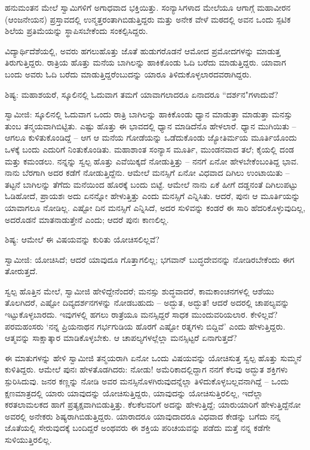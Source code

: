 ಹನುಮಂತನ ಮೇಲೆ ಸ್ವಾಮಿಗಳಿಗೆ ಅಗಾಧವಾದ ಭಕ್ತಿಯಿತ್ತು. ಸಂನ್ಯಾಸಿಗಳಾದ ಮೇಲೆಯೂ ಆಗಾಗ್ಗೆ ಮಹಾವೀರನ (ಆಂಜನೇಯನ) ಪ್ರಸ್ತಾವದಲ್ಲಿ ಉನ್ಮತ್ತರಂತಾಗಿಬಿಡುತ್ತಿದ್ದರು ಮತ್ತು ಅನೇಕ ವೇಳೆ ಮಠದಲ್ಲಿ ಅವನ ಒಂದು ಸ್ಪಟಿಕ ಶಿಲೆಯ ಪ್ರತಿಮೆಯನ್ನು ಸ್ಥಾಪಿಸಬೇಕೆಂದು ಸಂಕಲ್ಪಿಸಿದ್ದರು.

ವಿದ್ಯಾರ್ಥಿದೆಶೆಯಲ್ಲಿ, ಅವರು ಹಗಲುಹೊತ್ತು ಜೊತೆ ಹುಡುಗರೊಡನೆ ಆಮೋದ ಪ್ರಮೋದಗಳನ್ನು ಮಾಡುತ್ತ ತಿರುಗುತ್ತಿದ್ದರು. ರಾತ್ರಿಯ ಹೊತ್ತು ಮನೆಯ ಬಾಗಿಲನ್ನು ಹಾಕಿಕೊಂಡು ಓದಿ ಬರೆದು ಮಾಡುತ್ತಿದ್ದರು. ಯಾವಾಗ ಬಂದು ಅವರು ಓದಿ ಬರೆದು ಮಾಡುತ್ತಿದ್ದರೆಂಬುದನ್ನು ಯಾರೂ ತಿಳಿದುಕೊಳ್ಳಲಾರದವರಾಗಿದ್ದರು.

\delimiter

ಶಿಷ್ಯ: ಮಹಾಶಯರೆ, ಸ್ಕೂಲಿನಲ್ಲಿ ಓದುವಾಗ ತಮಗೆ ಯಾವಾಗಲಾದರೂ ಏನಾದರೂ “ದರ್ಶನ"ಗಳಾದುವೆ?

ಸ್ವಾಮೀಜಿ: ಸ್ಕೂಲಿನಲ್ಲಿ ಓದುವಾಗ ಒಂದು ರಾತ್ರಿ ಬಾಗಿಲನ್ನು ಹಾಕಿಕೊಂಡು ಧ್ಯಾನ ಮಾಡುತ್ತಾ ಮಾಡುತ್ತಾ ಮನಸ್ಸು ತುಂಬ ತನ್ಮಯವಾಗಿಬಿಟ್ಟಿತು. ಎಷ್ಟು ಹೊತ್ತು ಈ ಭಾವದಲ್ಲಿ ಧ್ಯಾನ ಮಾಡಿದೆನೊ ಹೇಳಲಾರೆ. ಧ್ಯಾನ ಮುಗಿಯಿತು – ಆಗಲೂ ಕುಳಿತುಕೊಂಡಿದ್ದೆ – ಆಗ ಆ ಮನೆಯ ಗೋಡೆಯನ್ನು ಒಡೆದುಕೊಂಡು ಜ್ಯೋತಿರ್ಮಯ ಮೂರ್ತಿಯೊಂದು ಒಳಕ್ಕೆ ಬಂದು ಎದುರಿಗೆ ನಿಂತುಕೊಂಡಿತು. ಮಹಾಶಾಂತ ಸಂನ್ಯಾಸ ಮೂರ್ತಿ, ಮುಂಡನವಾದ ತಲೆ; ಕೈಯಲ್ಲಿ ದಂಡ ಮತ್ತು ಕಮಂಡಲು. ನನ್ನನ್ನು ಸ್ವಲ್ಪ ಹೊತ್ತು ಎವೆಯಿಕ್ಕದೆ ನೋಡುತ್ತಿತ್ತು – ನನಗೆ ಏನೋ ಹೇಳಬೇಕೆಂಬಂತಿದ್ದ ಭಾವ. ನಾನು ಬೆರಗಾಗಿ ಅದರ ಕಡೆಗೆ ನೋಡುತ್ತಿದ್ದೆನು. ಆಮೇಲೆ ಮನಸ್ಸಿಗೆ ಏನೋ ವಿಧವಾದ ದಿಗಿಲು ಉಂಟಾಯಿತು – ತಟ್ಟನೆ ಬಾಗಿಲನ್ನು ತೆಗೆದು ಮನೆಯಿಂದ ಹೊರಕ್ಕೆ ಬಂದು ಬಿಟ್ಟೆ. ಆಮೇಲೆ ನಾನು ಏಕೆ ಹೀಗೆ ದಡ್ಡನಂತೆ ದಿಗಿಲುಪಟ್ಟು ಓಡಿಹೋದೆ, ಪ್ರಾಯಶಃ ಅದು ಏನನ್ನೋ ಹೇಳುತ್ತಿತ್ತು ಎಂದು ಮನಸ್ಸಿಗೆ ಎನ್ನಿಸಿತು. ಆದರೆ, ಪುನಃ ಆ ಮೂರ್ತಿಯನ್ನು ಯಾವಾಗಲೂ ನೋಡಿಲ್ಲ. ಎಷ್ಟೋ ದಿನ ಮನಸ್ಸಿಗೆ ಎನ್ನಿಸಿದೆ, ಅದರ ಸುಳಿವನ್ನು ಕಂಡರೆ ಈ ಸಾರಿ ಹೆದರಿಕೊಳ್ಳುವುದಿಲ್ಲ, ಅದರೊಡನೆ ಮಾತನಾಡುತ್ತೇನೆ ಎಂದು; ಆದರೆ ಪುನಃ ಕಾಣಲಿಲ್ಲ.

ಶಿಷ್ಯ: ಆಮೇಲೆ ಈ ವಿಷಯವನ್ನು ಕುರಿತು ಯೋಚಿಸಲಿಲ್ಲವೆ?

ಸ್ವಾಮೀಜಿ: ಯೋಚಿಸಿದೆ; ಆದರೆ ಯಾವುದೂ ಗೊತ್ತಾಗಲಿಲ್ಲ; ಭಗವಾನ್ ಬುದ್ಧದೇವನನ್ನು ನೋಡಿರಬೇಕೆಂದು ಈಗ ತೋರುತ್ತದೆ.

ಸ್ವಲ್ಪ ಹೊತ್ತಿನ ಮೇಲೆ, ಸ್ವಾಮೀಜಿ ಹೇಳಿದ್ದೇನೆಂದರೆ; ಮನಸ್ಸು ಶುದ್ಧವಾದರೆ, ಕಾಮಕಾಂಚನಗಳಲ್ಲಿ ಆಶೆಯು ತೊಲಗಿದರೆ, ಎಷ್ಟೋ ದಿವ್ಯದರ್ಶನಗಳನ್ನು ನೋಡಬಹುದು – ಅದ್ಭುತ, ಅದ್ಭುತ! ಆದರೆ ಅದರಲ್ಲಿ ಚಾಪಲ್ಯವನ್ನು ಇಟ್ಟುಕೊಳ್ಳಬಾರದು. ಇವುಗಳಲ್ಲಿ ಹಗಲು ರಾತ್ರೆಯೂ ಮನಸ್ಸಿದ್ದರೆ ಸಾಧಕ ಮುಂದುವರಿಯಲಾರ. ಕೇಳಿಲ್ಲವೆ? ಪರಮಹಂಸರು ‘ನನ್ನ ಪ್ರಿಯನಾಥನ ಗರ್ಭಗುಡಿಯ ಹೊರಗೆ ಎಷ್ಟೋ ರತ್ನಗಳು ಬಿದ್ದಿವೆ’ ಎಂದು ಹೇಳುತ್ತಿದ್ದರು. ಆತ್ಮವನ್ನು ಸಾಕ್ಷಾತ್ಕಾರ ಮಾಡಿಕೊಳ್ಳಬೇಕು. ಆ ಚಾಪಲ್ಯಗಳಲ್ಲೆಲ್ಲಾ ಮನಸ್ಸಿಟ್ಟರೆ ಏನಾಗುತ್ತದೆ?

ಈ ಮಾತುಗಳನ್ನು ಹೇಳಿ ಸ್ವಾಮೀಜಿ ತನ್ಮಯರಾಗಿ ಏನೋ ಒಂದು ವಿಷಯವನ್ನು ಯೋಚಿಸುತ್ತ ಸ್ವಲ್ಪ ಹೊತ್ತು ಸುಮ್ಮನೆ ಕುಳಿತಿದ್ದರು. ಆಮೇಲೆ ಪುನಃ ಹೇಳತೊಡಗಿದರು: ನೋಡು! ಅಮೆರಿಕಾದಲ್ಲಿದ್ದಾಗ ನನಗೆ ಕೆಲವು ಅದ್ಭುತ ಶಕ್ತಿಗಳು ಸ್ಪುರಿಸಿದುವು. ಜನರ ಕಣ್ಣನ್ನು ನೋಡಿ ಅವರ ಮನಸ್ಸಿನೊಳಗಿರುವುದನ್ನೆಲ್ಲಾ ತಿಳಿದುಕೊಳ್ಳಬಲ್ಲವನಾಗಿದ್ದೆ – ಒಂದು ಕ್ಷಣಮಾತ್ರದಲ್ಲಿ ಯಾರು ಯಾವುದನ್ನು ಯೋಚಿಸುತ್ತಿದ್ದರು, ಯಾವುದನ್ನು ಯೋಚಿಸುತ್ತಿರಲಿಲ್ಲ, ಇದೆಲ್ಲಾ ಕರತಲಾಮಲಕದ ಹಾಗೆ ಪ್ರತ್ಯಕ್ಷವಾಗಿಬಿಡುತ್ತಿತ್ತು. ಕೆಲಕೆಲವರಿಗೆ ಅದನ್ನು ಹೇಳುತ್ತಿದ್ದೆ; ಯಾರುಯಾರಿಗೆ ಹೇಳುತ್ತಿದ್ದೆನೋ ಅವರಲ್ಲಿ ಅನೇಕರು ಶಿಷ್ಯರಾಗಿಬಿಡುತ್ತಿದ್ದರು. ಯಾರಾದರೂ ಯಾವುದಾದರೂ ವಿಧವಾದ ಕೇಡನ್ನು ಬಗೆದು ನನ್ನ ಜೊತೆಯಲ್ಲಿ ಸೇರುವುದಕ್ಕೆ ಬಂದಿದ್ದರೆ ಅಂಥವರು ಈ ಶಕ್ತಿಯ ಪರಿಚಯವನ್ನು ಪಡೆದು ಮತ್ತೆ ನನ್ನ ಕಡೆಗೇ ಸುಳಿಯುತ್ತಿರಲಿಲ್ಲ.

